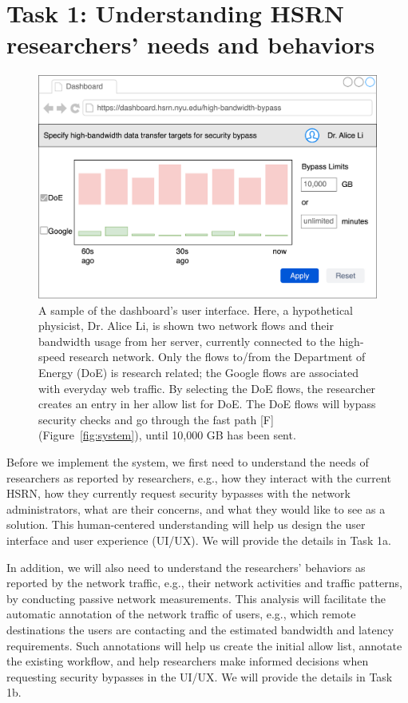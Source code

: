 \section{Task 1: Understanding HSRN researchers' needs and behaviors}

\begin{figure}[t]
    \centering
    \includegraphics[width=0.7\linewidth]{figures/dashboard.png}
    \caption{A sample of the dashboard's user interface. Here, a hypothetical physicist, Dr. Alice Li, is shown two network flows and their bandwidth usage from her server, currently connected to the high-speed research network. Only the flows to/from the Department of Energy (DoE) is research related; the Google flows are associated with everyday web traffic. By selecting the DoE flows, the researcher creates an entry in her allow list for DoE. The DoE flows will bypass security checks and go through the fast path [F] (Figure~\ref{fig:system}), until 10,000 GB has been sent.}
    \label{fig:dashboard}
\end{figure}

Before we implement the system, we first need to understand the needs of researchers as reported by researchers, e.g., how they interact with the current HSRN, how they currently request security bypasses with the network administrators, what are their concerns, and what they would like to see as a solution. This human-centered understanding will help us design the user interface and user experience (UI/UX). We will provide the details in Task 1a.

In addition, we will also need to understand the researchers' behaviors as reported by the network traffic, e.g., their network activities and traffic patterns, by conducting passive network measurements. This analysis will facilitate the automatic annotation of the network traffic of users, e.g., which remote destinations the users are contacting and the estimated bandwidth and latency requirements. Such annotations will help us create the initial allow list, annotate the existing workflow, and help researchers make informed decisions when requesting security bypasses in the UI/UX. We will provide the details in Task 1b.

